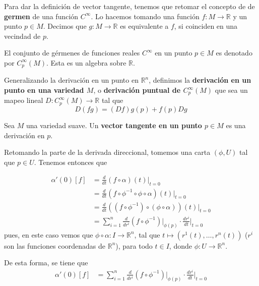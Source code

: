 \documentclass[12pt]{report}
\theoremstyle{largebreak}
\newcommand{\cf}[3]{\ensuremath{#1:#2\rightarrow#3}}
\begin{document}
    Para dar la definición de vector tangente, tenemos que retomar el concepto de de \textbf{germen} de una función $C^\infty$. Lo hacemos tomando una función $\cf{f}{M}{\mathbb{R}}$ y un punto $p\in M$. Decimos que $\cf{g}{M}{\mathbb{R}}$ es equivalente a $f$, si coinciden en una vecindad de $p$.

    El conjunto de gérmenes de funciones reales $C^\infty$ en un punto $p\in M$ es denotado por $C_p^\infty(M)$. Esta es un algebra sobre $\mathbb{R}$.

    Generalizando la derivación en un punto en $\mathbb{R}^n$, definimos la \textbf{derivación en un punto en una variedad $M$}, o \textbf{derivación puntual de $C_p^\infty(M)$} que sea un mapeo lineal $\cf{D}{C_p^\infty(M)}{\mathbb{R}}$ tal que
    \begin{equation*}
        D(fg)=(Df)g(p)+f(p)Dg
    \end{equation*}

    \begin{mydef}
        Sea $M$ una variedad suave. Un \textbf{vector tangente en un punto $p\in M$} es una derivación en $p$.
    \end{mydef}

    Retomando la parte de la derivada direccional, tomemos una carta $(\phi, U)$ tal que $p\in U$. Tenemos entonces que

    \begin{equation}
        \begin{split}
            \alpha'(0)[f]&=\frac{d}{dt}(f\circ\alpha)(t)\Big|_{t=0}\\
            &=\frac{d}{dt}(f\circ\phi^{-1}\circ\phi\circ\alpha)(t)\Big|_{t=0}\\
            &=\frac{d}{dt}((f\circ\phi^{-1})\circ(\phi\circ\alpha))(t)\Big|_{t=0}\\
            &=\sum_{i=1}^{n}\frac{d}{dr^i}(f\circ\phi^{-1})\Big|_{\phi(p)}\cdot \frac{dr^i}{dt}\Big|_{t=0}
        \end{split}
    \end{equation}
    pues, en este caso vemos que $\cf{\phi\circ\alpha}{I}{\mathbb{R}^n}$, tal que $t\mapsto (r^1(t),\dots,r^n(t))$ ($r^i$ son las funciones coordenadas de $\mathbb{R}^n$), para todo $t\in I$, donde $\cf{\phi}{U}{\mathbb{R}^n}$.
    
    De esta forma, se tiene que
    \begin{equation*}
        \begin{split}
            \alpha'(0)[f]&=\sum_{i=1}^{n}\frac{d}{dr^i}(f\circ\phi^{-1})\Big|_{\phi(p)}\cdot \frac{dr^i}{dt}\Big|_{t=0}
        \end{split}
    \end{equation*}
\end{document}
